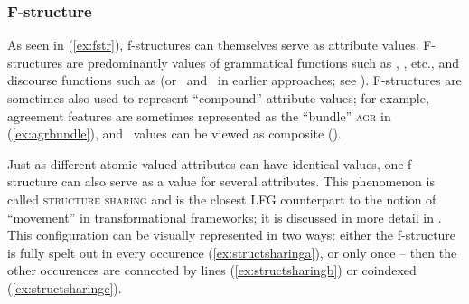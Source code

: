 \documentclass[output=paper,hidelinks]{langscibook}
\begin{document}
 \subsubsection{F-structure\label{sect:fstrval}} As seen in (\ref{ex:fstr}), f-structures can themselves serve as attribute values. F-structures are predominantly values of grammatical functions such as \SUBJ, \OBJ, etc., and discourse functions such as \DIS (or \TOPIC\ and \FOCUS\ in earlier approaches; see ). F-structures are sometimes also used to represent ``compound'' attribute values; for example, agreement features are sometimes represented as the ``bundle'' \textsc{agr} in (\ref{ex:agrbundle}), and \PRED\ values can be viewed as composite ().
 
 \begin{exe}
 \ex{}
 \end{exe}
 
 Just as different atomic-valued attributes can have identical values, one f-struc\-ture can also serve as a value for several attributes. This phenomenon is called \textsc{structure sharing} and is the closest LFG counterpart to the notion of ``movement'' in transformational frameworks; it is discussed in more detail in . This configuration can be visually represented in two ways: either the f-structure is fully spelt out in every occurence (\ref{ex:structsharinga}), or only once -- then the other occurences are connected by lines (\ref{ex:structsharingb}) or coindexed (\ref{ex:structsharingc}).
 
 \ea
 \ea\label{ex:structsharinga}
 \ex\label{ex:structsharingb}
 \ex\label{ex:structsharingc}
  \z\z
  
\end{document}
